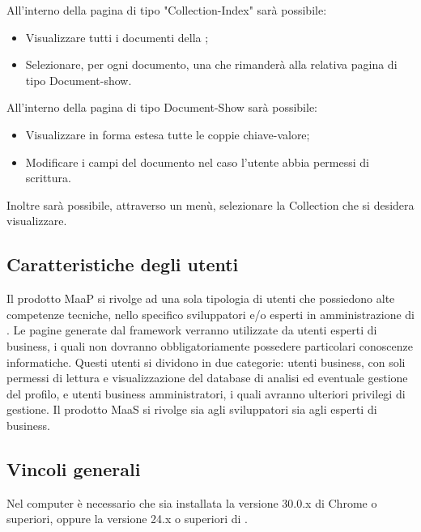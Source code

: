 All'interno della pagina di tipo "Collection-Index" sarà possibile:
\begin{itemize}
\item Visualizzare tutti i documenti della ;
\item Selezionare, per ogni documento, una  che rimanderà alla relativa pagina di tipo Document-show.
\end{itemize}

All'interno della pagina di tipo Document-Show sarà possibile:
\begin{itemize}
\item Visualizzare in forma estesa tutte le coppie chiave-valore;
\item Modificare i campi del documento nel caso l'utente abbia permessi di scrittura.
\end{itemize}

Inoltre sarà possibile, attraverso un menù, selezionare la Collection che si desidera visualizzare.

\subsection{Caratteristiche degli utenti}
Il prodotto MaaP si rivolge ad una sola tipologia di utenti che possiedono alte competenze tecniche, nello specifico sviluppatori e/o esperti in amministrazione di . Le pagine generate dal framework verranno utilizzate da utenti esperti di business, i quali non dovranno obbligatoriamente possedere particolari conoscenze informatiche. Questi utenti si dividono in due categorie: utenti business, con soli permessi di lettura e visualizzazione del database di analisi ed eventuale gestione del profilo, e utenti business amministratori, i quali avranno ulteriori privilegi di gestione.
Il prodotto MaaS si rivolge sia agli sviluppatori sia agli esperti di business.

\subsection{Vincoli generali}
Nel computer è necessario che sia installata la versione 30.0.x di  Chrome o superiori, oppure la versione 24.x o superiori di .

\newpage
